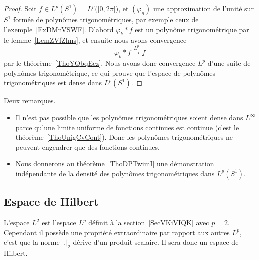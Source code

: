\begin{proof}
    Soit \( f\in L^p(S^1)=L^p\big( \mathopen[ 0 , 2\pi \mathclose] \big)\), et \( (\varphi_n)\) une approximation de l'unité sur \( S^1\) formée de polynômes trigonométriques, par exemple ceux de l'exemple~\ref{ExDMnVSWF}. D'abord \( \varphi_k*f\) est un polynôme trigonométrique par le lemme~\ref{LemZVfZlms}, et ensuite nous avons convergence
    \begin{equation}
        \varphi_k*f\stackrel{L^p}{\to}f
    \end{equation}
    par le théorème~\ref{ThoYQbqEez}. Nous avons donc convergence \( L^p\) d'une suite de polynômes trigonométrique, ce qui prouve que l'espace de polynômes trigonométriques est dense dans \( L^p(S^1)\).
\end{proof}

\begin{remark}
    Deux remarques.
    \begin{itemize}
        \item
            Il n'est pas possible que les polynômes trigonométriques soient dense dans \( L^{\infty}\) parce qu'une limite uniforme de fonctions continues est continue (c'est le théorème~\ref{ThoUnigCvCont}). Donc les polynômes trigonométriques ne peuvent engendrer que des fonctions continues.
        \item
            Nous donnerons au théorème~\ref{ThoDPTwimI} une démonstration indépendante de la densité des polynômes trigonométriques dans \( L^p(S^1)\).
    \end{itemize}
\end{remark}

\subsection{Espace de Hilbert}

L'espace \( L^2\) est l'espace \( L^p\) définit à la section~\ref{SecVKiVIQK} avec \( p=2\). Cependant il possède une propriété extraordinaire par rapport aux autres \( L^p\), c'est que la norme \( | . |_2\) dérive d'un produit scalaire. Il sera donc un espace de Hilbert.

